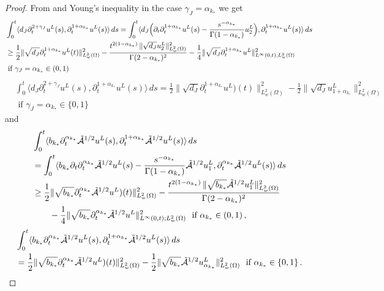 \begin{proof}
From 
and Young's inequality in the case $\gamma_J=\alpha_{k_*}$ we get
\[
\begin{aligned}
&\int_0^t\langle d_J \partial_t^{2+\gamma_J} u^L(s), \partial_t^{1+\alpha_{k_*}}u^L(s)\rangle\, ds
=\int_0^t\langle d_J \Bigl(\partial_t\partial_t^{1+\alpha_{k_*}} u^L(s)
-\frac{s^{-\alpha_{k_*}}}{\Gamma(1-\alpha_{k_*})} u_2^L\Bigr), \partial_t^{1+\alpha_{k_*}}u^L(s)\rangle\, ds\\
&\geq\frac12\|\sqrt{d_J}\partial_t^{1+\alpha_{k_*}} u^L(t)\|_{L^2_w(\Omega)}^2
-\frac{t^{2(1-\alpha_{k_*})}\,\|\sqrt{d_J}u_2^L\|_{L^2_w(\Omega)}^2}{\Gamma(2-\alpha_{k_*})^2}
-\frac14 \|\sqrt{d_J}\partial_t^{1+\alpha_{k_*}}u^L\|_{L^\infty(0,t);L^2_w(\Omega)}^2\\
&\mbox{ if }\gamma_J=\alpha_{k_*}\in(0,1)
\end{aligned} 
\]
\[
\begin{aligned}
&\int_0^t\langle d_J \partial_t^{2+\gamma_J} u^L(s), \partial_t^{1+\alpha_{k_*}}u^L(s)\rangle\, ds
=\frac12\|\sqrt{d_J}\partial_t^{1+\alpha_{k_*}} u^L)(t)\|_{L^2_w(\Omega)}^2
-\frac12\|\sqrt{d_J} u^L_{1+\alpha_{k_*}}\|_{L^2_w(\Omega)}^2\\
&\mbox{ if }\gamma_J=\alpha_{k_*}\in\{0,1\}
\end{aligned} 
\]
and 
\[
\begin{aligned}
&\int_0^t\langle b_{k_*} \partial_t^{\alpha_{k_*}} \tilde{\mathcal{A}}^{1/2}u^L(s), \partial_t^{1+\alpha_{k_*}}\tilde{\mathcal{A}}^{1/2}u^L(s)\rangle\, ds\\
&=\int_0^t\langle b_{k_*} \partial_t\partial_t^{\alpha_{k_*}} \tilde{\mathcal{A}}^{1/2}u^L(s)
-\frac{s^{-\alpha_{k_*}}}{\Gamma(1-\alpha_{k_*})} \tilde{\mathcal{A}}^{1/2}u_1^L, \partial_t^{\alpha_{k_*}}\tilde{\mathcal{A}}^{1/2}u^L(s)\rangle\, ds\\
&\geq\frac12\|\sqrt{b_{k_*}}\partial_t^{\alpha_{k_*}} \tilde{\mathcal{A}}^{1/2}u^L)(t)\|_{L^2_w(\Omega)}^2
-\frac{t^{2(1-\alpha_{k_*})}\,\|\sqrt{b_{k_*}}\tilde{\mathcal{A}}^{1/2}u_1^L\|_{L^2_w(\Omega)}^2}{\Gamma(2-\alpha_{k_*})^2} 
\\&\qquad
-\frac14 \|\sqrt{b_{k_*}}\partial_t^{\alpha_{k_*}}\tilde{\mathcal{A}}^{1/2}u^L\|_{L^\infty(0,t);L^2_w(\Omega)}^2
\ \mbox{ if }\alpha_{k_*}\in(0,1)
\,,
\end{aligned} 
\]
\[
\begin{aligned}
&\int_0^t\langle b_{k_*} \partial_t^{\alpha_{k_*}} \tilde{\mathcal{A}}^{1/2}u^L(s), \partial_t^{1+\alpha_{k_*}}\tilde{\mathcal{A}}^{1/2}u^L(s)\rangle\, ds\\
&=\frac12\|\sqrt{b_{k_*}}\partial_t^{\alpha_{k_*}} \tilde{\mathcal{A}}^{1/2}u^L)(t)\|_{L^2_w(\Omega)}^2
-\frac12\|\sqrt{b_{k_*}} \tilde{\mathcal{A}}^{1/2}u^L_{\alpha_{k_*}}\|_{L^2_w(\Omega)}^2
\ \mbox{ if }\alpha_{k_*}\in\{0,1\}
\,.
\end{aligned} 
\]


\end{proof}
